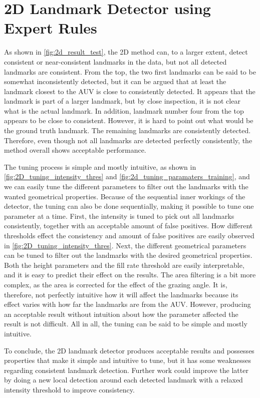 \section{2D Landmark Detector using Expert Rules}

As shown in \cref{fig:2d_result_test}, the 2D method can, to a larger extent, detect consistent or near-consistent landmarks in the data, but not all detected landmarks are consistent. From the top, the two first landmarks can be said to be somewhat inconsistently detected, but it can be argued that at least the landmark closest to the AUV is close to consistently detected. It appears that the landmark is part of a larger landmark, but by close inspection, it is not clear what is the actual landmark. In addition, landmark number four from the top appears to be close to consistent. However, it is hard to point out what would be the ground truth landmark. The remaining landmarks are consistently detected. Therefore, even though not all landmarks are detected perfectly consistently, the method overall shows acceptable performance.

The tuning process is simple and mostly intuitive, as shown in \cref{fig:2D_tuning_intensity_thres} and \cref{fig:2d_tuning_paramaters_training}, and we can easily tune the different parameters to filter out the landmarks with the wanted geometrical properties. Because of the sequential inner workings of the detector, the tuning can also be done sequentially, making it possible to tune one parameter at a time. First, the intensity is tuned to pick out all landmarks consistently, together with an acceptable amount of false positives. How different thresholds effect the consistency and amount of false positives are easily observed in \cref{fig:2D_tuning_intensity_thres}. Next, the different geometrical parameters can be tuned to filter out the landmarks with the desired geometrical properties. Both the height parameters and the fill rate threshold are easily interpretable, and it is easy to predict their effect on the results. The area filtering is a bit more complex, as the area is corrected for the effect of the grazing angle. It is, therefore, not perfectly intuitive how it will affect the landmarks because its effect varies with how far the landmarks are from the AUV. However, producing an acceptable result without intuition about how the parameter affected the result is not difficult. All in all, the tuning can be said to be simple and mostly intuitive. 

To conclude, the 2D landmark detector produces acceptable results and possesses properties that make it simple and intuitive to tune, but it has some weaknesses regarding consistent landmark detection. Further work could improve the latter by doing a new local detection around each detected landmark with a relaxed intensity threshold to improve consistency.

